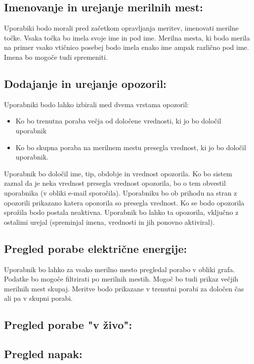 \documentclass[12pt,a4paper,titlepage,openany]{report}
\begin{document}
\subsection{Imenovanje in urejanje merilnih mest:}
Uporabiki bodo morali pred začetkom opravljanja meritev, imenovati merilne točke. Vsaka točka bo imela svoje ime in pod ime. Merilna mesta, ki bodo merila na primer vsako vtičnico posebej bodo imela enako ime ampak različno pod ime. Imena bo mogoče tudi spremeniti.

\subsection{Dodajanje in urejanje opozoril:}
Uporabniki bodo lahko izbirali med dvema vrstama opozoril:
\begin{itemize}
\item Ko bo trenutna poraba večja od določene vrednosti, ki jo bo določil uporabnik
\item Ko bo skupna poraba na merilnem mestu presegla vrednost, ki jo bo določil uporabnik.
\end{itemize}
Uporabnik bo določil ime, tip, obdobje in vrednost opozorila. Ko bo sistem zaznal da je neka vrednost presegla vrednost opozorila, bo o tem obvestil uporabnika (v obliki e-mail sporočila). Uporabniku bo ob prihodu na stran z opozorili prikazano katera opozorila so presegla vrednost.
Ko se bodo opozorila sprožila bodo postala neaktivna. Uporabnik bo lahko ta opozorila, vključno z ostalimi urejal (spreminjal imena, vrednosti in jih ponovno aktiviral).

\subsection{Pregled porabe električne energije:}
Uporabnik bo lahko za vsako merilno mesto pregledal porabo v obliki grafa. Podatke bo mogoče filtrirati po merilnih mestih. Mogoč bo tudi prikaz večjih merilnih mest skupaj. Meritve bodo prikazane v trenutni porabi za določen čas ali pa v skupni porabi.

\subsection{Pregled porabe "v živo":}

\subsection{Pregled napak:}
\end{document}
